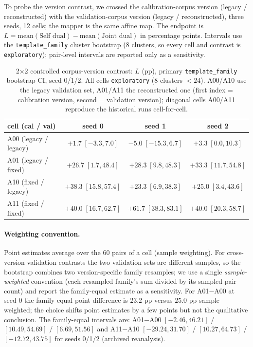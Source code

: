\documentclass[11pt,a4paper]{article}
\begin{document}
To probe the version contrast, we crossed the calibration-corpus version
(legacy / reconstructed) with the validation-corpus version (legacy /
reconstructed), three seeds, 12 cells; the mapper is the same affine map. The
endpoint is $L=\mathrm{mean}(\text{Self dual})-\mathrm{mean}(\text{Joint dual})$
in percentage points. Intervals use the \texttt{template\_family} cluster
bootstrap (8 clusters, so every cell and contrast is \texttt{exploratory});
pair-level intervals are reported only as a sensitivity.

\begin{table}[t]
\centering
\caption{2$\times$2 controlled corpus-version contrast: $L$ (pp), primary
\texttt{template\_family} bootstrap CI, seed 0/1/2. All cells
\texttt{exploratory} (8 clusters $<24$). A00/A10 use the legacy validation
set, A01/A11 the reconstructed one (first index = calibration version, second
= validation version); diagonal cells A00/A11 reproduce the historical runs
cell-for-cell.}
\label{tab:audit2x2}
\begin{tabular}{lccc}
\toprule
cell (cal / val) & seed 0 & seed 1 & seed 2 \\
\midrule
A00 (legacy / legacy) & $+1.7\;[-3.3,7.0]$ & $-5.0\;[-15.3,6.7]$ & $+3.3\;[0.0,10.3]$ \\
A01 (legacy / fixed)  & $+26.7\;[1.7,48.4]$ & $+28.3\;[9.8,48.3]$ & $+33.3\;[11.7,54.8]$ \\
A10 (fixed / legacy)  & $+38.3\;[15.8,57.4]$ & $+23.3\;[6.9,38.3]$ & $+25.0\;[3.4,43.6]$ \\
A11 (fixed / fixed)   & $+40.0\;[16.7,62.7]$ & $+61.7\;[38.3,83.1]$ & $+40.0\;[20.3,58.7]$ \\
\bottomrule
\end{tabular}
\end{table}

\paragraph{Weighting convention.} Point estimates average over the 60 pairs of
a cell (sample weighting). For cross-version validation contrasts the two
validation sets are different samples, so the bootstrap combines two
version-specific family resamples; we use a single \emph{sample-weighted}
convention (each resampled family's sum divided by its sampled pair count) and
report the family-equal estimate as a sensitivity. For A01$-$A00 at seed 0 the
family-equal point difference is $23.2$ pp versus $25.0$ pp sample-weighted;
the choice shifts point estimates by a few points but not the qualitative
conclusion. The family-equal intervals are: A01$-$A00
$[-2.46,46.21]$ / $[10.49,54.69]$ / $[6.69,51.56]$ and A11$-$A10
$[-29.24,31.70]$ / $[10.27,64.73]$ / $[-12.72,43.75]$ for seeds 0/1/2
(archived reanalysis).
\end{document}
